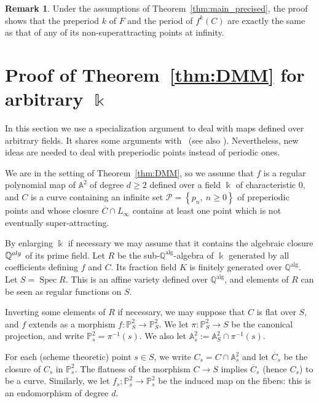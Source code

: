 \documentclass[11 pt, oneside, a4paper]{amsart}
\newcommand{\Q}{\mathbb{Q}}
\newcommand{\A}{\mathbb{A}}
\renewcommand{\P}{\mathbb{P}}
\newcommand{\set}[1]{{\left\{#1\right\}}}
\newcommand{\nk}{\Bbbk}
\DeclareMathOperator{\alg}{alg}
\DeclareMathOperator{\spec}{Spec}
\theoremstyle{definition}
\newtheorem{rmk}[thm]{Remark}
\theoremstyle{definition}
\begin{document}
\begin{rmk}\label{rmk:fixed}
Under the assumptions of Theorem~\ref{thm:main_precised}, the proof shows that the 
preperiod $k$ of $F$ and the period of $f^k(C)$ are exactly the same as that of any of its non-superattracting points at infinity. 
\end{rmk}

 	 
\section{Proof of Theorem~\ref{thm:DMM} for arbitrary $\nk$}\label{sec:spec}

In this section we use a specialization argument to deal with maps defined over arbitrary fields. 
It shares some arguments with~\cite[\S 5]{DMM-henon} (see also \cite[\S 7]{finite_orbits}). 
Nevertheless,  new ideas are needed to  deal with preperiodic points  instead of periodic ones. 

We are in the setting of Theorem~\ref{thm:DMM}, so we assume that $f$ is a regular polynomial map of $\A^2$ of degree $d\ge 2$ defined over a field $\nk$
of characteristic $0$, and $C$ is a curve containing
 an infinite set $\mathcal P = \set{p_n, \ n\geq 0}$ 
 of preperiodic  points 
and whose closure $\overline{C} \cap L_\infty$ contains at least one point which is not
eventually super-attracting.   

By enlarging  $\nk$ if necessary we may assume that it contains the algebraic closure $\Q^{\rm alg}$
of its prime field. 
Let $R$ be the sub-$\Q^{\alg}$-algebra of $\nk$ generated by 
all coefficients defining $f$ and $C$. Its fraction field $K$ 
is  finitely generated over $\Q^{\alg}$. Let $S = \spec R$.
This is an affine variety defined over $\Q^{\alg}$, and
elements of $R$ can be seen as regular functions on $S$. 

Inverting some elements of $R$ if necessary, we may suppose that 
$C$ is flat over $S$, and $f$ extends as a morphism $f\colon \P^2_S   \to  \P^2_S$.
We let $\pi \colon \P^2_S \to S$ be the canonical projection,  and write $\P^2_s = \pi^{-1}(s)$. 
We also let $\A^2_s:= \A^2_S \cap  \pi^{-1}(s)$.

For each  (scheme theoretic) point $s\in S$, we write $C_s = C\cap \A^2_s$ and let $\overline{C}_s$
  be the closure of $C_s$ in $\P^2_s$. The flatness of the morphism $C\to S$ implies 
  $\overline{C}_s$ (hence $C_s$) to be a curve. 
  Similarly, we let $f_s \colon \P^2_s \to \P^2_s$ be the induced map on the fibers: 
this is an endomorphism of degree $d$.
\end{document}

